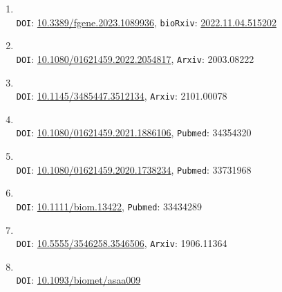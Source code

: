 \documentclass[letterpaper,11pt]{article}
\begin{document}
\begin{enumerate}

\item {}\quad
\\{\color{blue}\texttt{DOI}}: \href{https://www.frontiersin.org/articles/10.3389/fgene.2023.1089936/full}{10.3389/fgene.2023.1089936}, {\color{blue}\texttt{bioRxiv}}: \href{https://www.biorxiv.org/content/10.1101/2022.11.04.515202v1}{2022.11.04.515202}

\item {}\quad
\\{\color{blue}\texttt{DOI}}: \href{https://www.tandfonline.com/doi/abs/10.1080/01621459.2022.2054817}{10.1080/01621459.2022.2054817}, {\color{blue}\texttt{Arxiv}}: 2003.08222

\item {}\quad
\\{\color{blue}\texttt{DOI}}: \href{https://dl.acm.org/doi/10.1145/3485447.3512134}{10.1145/3485447.3512134}, {\color{blue}\texttt{Arxiv}}: 2101.00078

\item {}\quad
\\{\color{blue}\texttt{DOI}}: \href{https://www.tandfonline.com/doi/abs/10.1080/01621459.2021.1886106}{10.1080/01621459.2021.1886106}, {\color{blue}\texttt{Pubmed}}: 34354320

\item {}\quad
\\{\color{blue}\texttt{DOI}}: \href{https://www.tandfonline.com/doi/abs/10.1080/01621459.2020.1738234?journalCode=uasa20}{10.1080/01621459.2020.1738234}, {\color{blue}\texttt{Pubmed}}: 33731968

\item {}\quad
\\{\color{blue}\texttt{DOI}}: \href{https://onlinelibrary.wiley.com/doi/abs/10.1111/biom.13422}{10.1111/biom.13422}, {\color{blue}\texttt{Pubmed}}: 33434289

\item {}\quad
\\{\color{blue}\texttt{DOI}}: \href{https://dl.acm.org/doi/abs/10.5555/3546258.3546506}{10.5555/3546258.3546506}, {\color{blue}\texttt{Arxiv}}: 1906.11364

\item {}\quad
\\{\color{blue}\texttt{DOI}}: \href{https://academic.oup.com/biomet/article-abstract/107/2/285/5837741}{10.1093/biomet/asaa009}


\end{enumerate}
\end{document}
